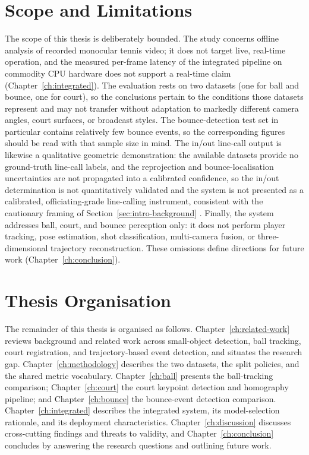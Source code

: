 \section{Scope and Limitations}
\label{sec:intro-scope}

The scope of this thesis is deliberately bounded. The study concerns
offline analysis of recorded monocular tennis video; it does not target
live, real-time operation, and the measured per-frame latency of the integrated
pipeline on commodity CPU hardware does not support a real-time claim
(Chapter~\ref{ch:integrated}). The evaluation rests on two datasets (one for
ball and bounce, one for court), so the conclusions pertain to the conditions
those datasets represent and may not transfer without adaptation to markedly
different camera angles, court surfaces, or broadcast styles. The
bounce-detection test set in particular contains relatively few bounce events,
so the corresponding figures should be read with that sample size in mind. The
in/out line-call output is likewise a qualitative geometric demonstration: the
available datasets provide no ground-truth line-call labels, and the
reprojection and bounce-localisation uncertainties are not propagated into a
calibrated confidence, so the in/out determination is not quantitatively
validated and the system is not presented as a calibrated, officiating-grade
line-calling instrument, consistent with the cautionary framing of
Section~\ref{sec:intro-background} \cite{collins2008hawkeye}.
Finally, the system addresses ball, court, and bounce perception only: it does
not perform player tracking, pose estimation, shot classification, multi-camera
fusion, or three-dimensional trajectory reconstruction. These omissions define directions for future work (Chapter~\ref{ch:conclusion}).

\section{Thesis Organisation}
\label{sec:intro-organisation}

The remainder of this thesis is organised as follows.
Chapter~\ref{ch:related-work} reviews background and related work across
small-object detection, ball tracking, court registration, and trajectory-based
event detection, and situates the research gap.
Chapter~\ref{ch:methodology} describes the two datasets, the split policies, and
the shared metric vocabulary.
Chapter~\ref{ch:ball} presents the ball-tracking comparison;
Chapter~\ref{ch:court} the court keypoint detection and homography pipeline; and
Chapter~\ref{ch:bounce} the bounce-event detection comparison.
Chapter~\ref{ch:integrated} describes the integrated system, its model-selection
rationale, and its deployment characteristics.
Chapter~\ref{ch:discussion} discusses cross-cutting findings and threats to
validity, and Chapter~\ref{ch:conclusion} concludes by
answering the research questions and outlining future work.
